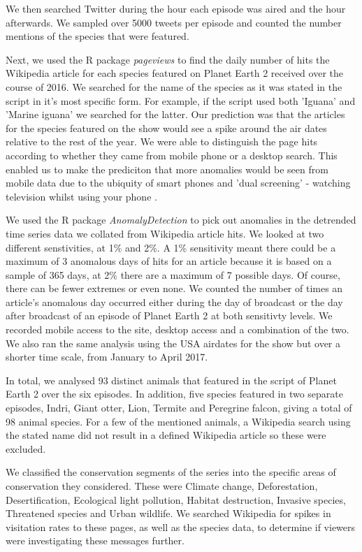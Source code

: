 \documentclass[12pt,letterpaper]{article}
\begin{document}
We then searched Twitter during the hour each episode was aired and the hour afterwards. We sampled over 5000 tweets per episode and counted the number mentions of the species that were featured. 

Next, we used the R package \textit{pageviews} to find the daily number of hits the Wikipedia article for each species featured on Planet Earth 2 received over the course of 2016. We searched for the name of the species as it was stated in the script in it's most specific form. For example, if the script used both 'Iguana' and 'Marine iguana' we searched for the latter. Our prediction was that the articles for the species featured on the show would see a spike around the air dates relative to the rest of the year. We were able to distinguish the page hits according to whether they came from mobile phone or a desktop search. This enabled us to make the prediciton that more anomalies would be seen from mobile data due to the ubiquity of smart phones and 'dual screening' - watching television whilst using your phone \cite{holz2015m}. 

We used the R package \textit{AnomalyDetection} to pick out anomalies in the detrended time series data we collated from Wikipedia article hits. We looked at two different senstivities, at 1\% and 2\%. A 1\% sensitivity meant there could be a maximum of 3 anomalous days of hits for an article because it is based on a sample of 365 days, at 2\% there are a maximum of 7 possible days. Of course, there can be fewer extremes or even none. We counted the number of times an article's anomalous day occurred either during the day of broadcast or the day after broadcast of an episode of Planet Earth 2 at both sensitivty levels. We recorded mobile access to the site, desktop access and a combination of the two. We also ran the same analysis using the USA airdates for the show but over a shorter time scale, from January to April 2017.   

In total, we analysed 93 distinct animals that featured in the script of Planet Earth 2 over the six episodes. In addition, five species featured in two separate episodes, Indri, Giant otter, Lion, Termite and Peregrine falcon, giving a total of 98 animal species. For a few of the mentioned animals, a Wikipedia search using the stated name did not result in a defined Wikipedia article so these were excluded. 

We classified the conservation segments of the series into the specific areas of conservation they considered. These were Climate change, Deforestation, Desertification, Ecological light pollution, Habitat destruction, Invasive species, Threatened species and Urban wildlife. We searched Wikipedia for spikes in visitation rates to these pages, as well as the species data, to determine if viewers were investigating these messages further.
\end{document}
